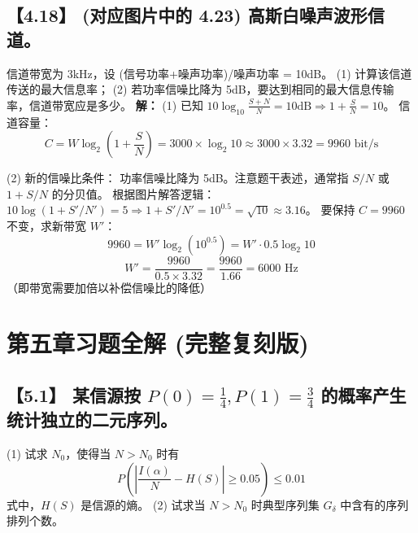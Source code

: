 \documentclass[11pt, a4paper]{article}
\begin{document}
\subsection*{【4.18】 (对应图片中的 4.23) 高斯白噪声波形信道。}
信道带宽为 3kHz，设 (信号功率+噪声功率)/噪声功率 = 10dB。
(1) 计算该信道传送的最大信息率；
(2) 若功率信噪比降为 5dB，要达到相同的最大信息传输率，信道带宽应是多少。
\textbf{解：}
(1) 已知 $10 \log_{10} \frac{S+N}{N} = 10 \text{dB} \Rightarrow 1 + \frac{S}{N} = 10$。
信道容量：
\[ C = W \log_2 (1 + \frac{S}{N}) = 3000 \times \log_2 10 \approx 3000 \times 3.32 = 9960 \text{ bit/s} \]

(2) 新的信噪比条件：
功率信噪比降为 5dB。注意题干表述，通常指 $S/N$ 或 $1+S/N$ 的分贝值。
根据图片解答逻辑：
$10 \log (1 + S'/N') = 5 \Rightarrow 1 + S'/N' = 10^{0.5} = \sqrt{10} \approx 3.16$。
要保持 $C = 9960$ 不变，求新带宽 $W'$：
\[ 9960 = W' \log_2 (10^{0.5}) = W' \cdot 0.5 \log_2 10 \]
\[ W' = \frac{9960}{0.5 \times 3.32} = \frac{9960}{1.66} = 6000 \text{ Hz} \]
（即带宽需要加倍以补偿信噪比的降低）

\section{第五章习题全解 (完整复刻版)}

\subsection*{【5.1】 某信源按 $P(0)=\frac{1}{4}, P(1)=\frac{3}{4}$ 的概率产生统计独立的二元序列。}
(1) 试求 $N_0$，使得当 $N > N_0$ 时有
\[ P\left( \left| \frac{I(\alpha)}{N} - H(S) \right| \ge 0.05 \right) \le 0.01 \]
式中，$H(S)$ 是信源的熵。
(2) 试求当 $N > N_0$ 时典型序列集 $G_\delta$ 中含有的序列排列个数。
\end{document}
